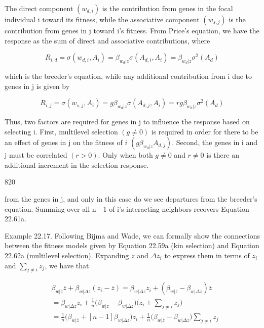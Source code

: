 \documentclass{article}
\begin{document}
The direct component  $ (w_{d,i}) $ is the contribution from genes in the focal individual i toward its fitness, while the associative component  $ (w_{s,j}) $ is the contribution from genes in j toward i's fitness. From Price's equation, we have the response as the sum of direct and associative contributions, where

\begin{equation}
R_{i,d}=\sigma(w_{d,i},A_{i})=\beta_{w_{d}|z}\sigma(A_{d,i},A_{i})=\beta_{w_{d}|z}\sigma^{2}(A_{d})
\tag{22.63c}
\label{eq:22_63c}
\end{equation}

which is the breeder’s equation, while any additional contribution from i due to genes in j is given by

\begin{equation}
R_{i,j}=\sigma(w_{s,j},A_{i})=g\beta_{w_{d}|z}\sigma(A_{d,j},A_{i})=r g\beta_{w_{d}|z}\sigma^{2}(A_{d})
\tag{22.63d}
\label{eq:22_63d}
\end{equation}

Thus, two factors are required for genes in j to influence the response based on selecting i. First, multilevel selection  $ (g \neq 0) $ is required in order for there to be an effect of genes in j on the fitness of  $ i $  $ (g \beta_{w_d|z} A_{d,j}) $. Second, the genes in i and j must be correlated  $ (r > 0) $. Only when both  $ g \neq 0 $ and  $ r \neq 0 $ is there an additional increment in the selection response.

820

from the genes in j, and only in this case do we see departures from the breeder's equation. Summing over all n - 1 of i's interacting neighbors recovers Equation 22.61a.

Example 22.17. Following Bijma and Wade, we can formally show the connections between the fitness models given by Equation 22.59a (kin selection) and Equation 22.62a (multilevel selection). Expanding  $ \overline{z} $ and  $ \Delta z_i $ to express them in terms of  $ z_i $ and  $ \sum_{j \neq i} z_j $, we have that

\begin{equation}
\begin{aligned}&\beta_{w|\overline{z}}\overline{z}+\beta_{w|\Delta z}(z_{i}-\overline{z})=\beta_{w|\Delta z}z_{i}+(\beta_{w|\overline{z}}-\beta_{w|\Delta z})\overline{z}\\ &=\beta_{w|\Delta z}z_{i}+\frac{1}{n}\Big(\beta_{w|\overline{z}}-\beta_{w|\Delta z}\Big)\Big(z_{i}+\sum_{j\neq i}z_{j}\Big)\\ &=\frac{1}{n}\Big(\beta_{w|\overline{z}}+[n-1]\beta_{w|\Delta z}\Big)z_{i}+\frac{1}{n}\Big(\beta_{w|\overline{z}}-\beta_{w|\Delta z}\Big)\sum_{j\neq i}z_{j}\\ \end{aligned}
\tag{22.64a}
\label{eq:22_64a}
\end{equation}
\end{document}
